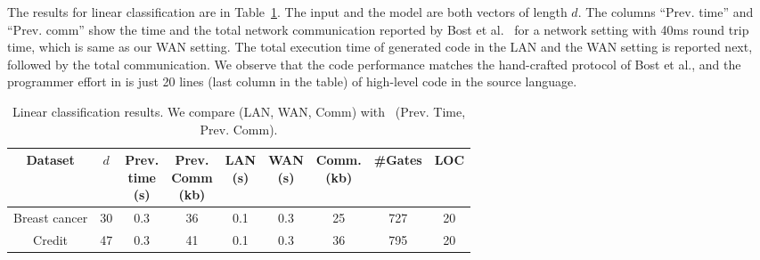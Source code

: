 The results for linear
classification are in Table~\ref{tab:lc}.
The input and the model are both vectors of length $d$. 
The columns ``Prev. time'' and ``Prev. comm'' show the time and the total
network communication reported by Bost et al.~\cite{shafindss} for a
network setting with 40ms
round trip time, which is same as our WAN setting. The total execution
time
of \tool generated code in the LAN and the WAN setting is reported
next, followed by the total communication.
We observe that the \tool code performance matches the hand-crafted protocol of Bost
et al., and the programmer effort in \tool is just 20
lines (last column in the table) of high-level code in the \tool
source language. %


\setlength\tabcolsep{2.5pt}
\begin{table}
\begin{tabular}{|c|c|c|c|c|c|c|c|c|}
\hline
Dataset & $d$  & \thead{Prev. \\ time\\ (s)} & \thead{Prev. \\ Comm\\ (kb)} & \thead{LAN  \\ (s)} & \thead{WAN\\ (s)} & \thead{Comm. \\(kb)}  &  \#Gates & LOC\\
\hline
Breast cancer & 30 & 0.3 & 36 & 0.1 & 0.3 & 25  & 727 & 20\\
\hline
Credit & 47 & 0.3 & 41 & 0.1 & 0.3 & 36  & 795 & 20\\
\hline
\end{tabular}
 \caption{Linear classification results. We compare \tool (LAN, WAN, Comm)
 with~\cite{shafindss} (Prev. Time, Prev. Comm).}
 \label{tab:lc} 
\end{table}


